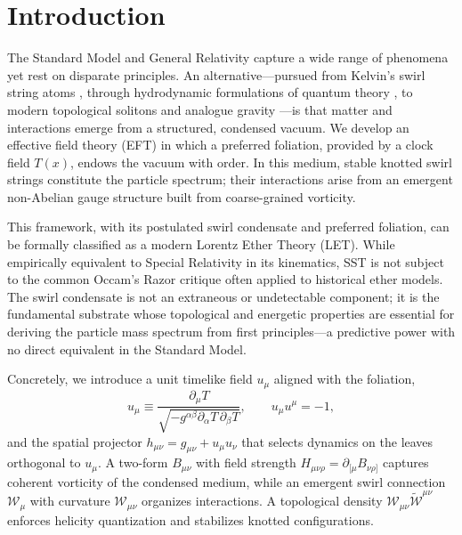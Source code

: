 \documentclass[11pt, preprint,titlepage]{revtex4-2}
\begin{document}
	\section{Introduction}

		The Standard Model and General Relativity capture a wide range of phenomena yet rest on disparate principles. An alternative—pursued from Kelvin’s swirl string atoms \cite{Kelvin1867}, through hydrodynamic formulations of quantum theory \cite{Madelung1927}, to modern topological solitons and analogue gravity \cite{Faddeev1997,Arnold1998,Barcelo2011,Volovik2003,Kleckner2013}—is that matter and interactions emerge from a structured, condensed vacuum. We develop an effective field theory (EFT) in which a preferred foliation, provided by a clock field \(T(x)\), endows the vacuum with order. In this medium, stable knotted swirl strings constitute the particle spectrum; their interactions arise from an emergent non-Abelian gauge structure built from coarse-grained vorticity.


		This framework, with its postulated swirl condensate and preferred foliation, can be formally classified as a modern Lorentz Ether Theory (LET). While empirically equivalent to Special Relativity in its kinematics, SST is not subject to the common Occam's Razor critique often applied to historical ether models. The swirl condensate is not an extraneous or undetectable component; it is the fundamental substrate whose topological and energetic properties are essential for deriving the particle mass spectrum from first principles—a predictive power with no direct equivalent in the Standard Model.

		Concretely, we introduce a unit timelike field \(u_\mu\) aligned with the foliation,
		\[
			u_\mu \equiv \frac{\partial_\mu T}{\sqrt{-g^{\alpha\beta}\partial_\alpha T\,\partial_\beta T}},
			\qquad u_\mu u^\mu = -1,
		\]
		and the spatial projector \(h_{\mu\nu}=g_{\mu\nu}+u_\mu u_\nu\) that selects dynamics on the leaves orthogonal to \(u_\mu\). A two-form \(B_{\mu\nu}\) with field strength \(H_{\mu\nu\rho}=\partial_{[\mu}B_{\nu\rho]}\) captures coherent vorticity of the condensed medium, while an emergent swirl connection \(\mathcal{W}_\mu\) with curvature \(\mathcal{W}_{\mu\nu}\) organizes interactions. A topological density \(\mathcal{W}_{\mu\nu}\tilde{\mathcal{W}}^{\mu\nu}\) enforces helicity quantization and stabilizes knotted configurations.
\end{document}
